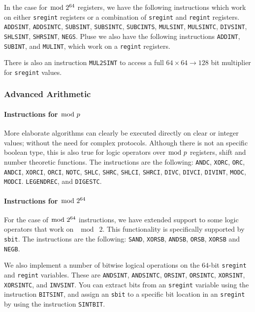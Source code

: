 In  the case for $\bmod \; 2^{64}$ registers, we have the following instructions
which work on either \verb|sregint| registers or a combination
of \verb|sregint| and \verb|regint| registers.
	\verb+ADDSINT+,
	\verb+ADDSINTC+,
	\verb+SUBSINT+,
	\verb+SUBSINTC+,
	\verb+SUBCINTS+,
	\verb+MULSINT+,
	\verb+MULSINTC+,
	\verb+DIVSINT+,
	\verb+SHLSINT+,
	\verb+SHRSINT+,
	\verb+NEGS+.
Pluse we also have the following instructions
  \verb+ADDINT+,
  \verb+SUBINT+, and
  \verb+MULINT+,
which work on a \verb|regint| registers.

There is also an instruction \verb+MUL2SINT+ to access a
full $64 \times 64 \longrightarrow 128$ bit multiplier
for \verb|sregint| values.

\subsubsection{Advanced Arithmetic}
\paragraph{Instructions for $\bmod \; p$}
More elaborate algorithms can clearly be executed directly on
clear or integer values; without the need for complex
protocols. Although there is not an specific boolean type, this is also true for logic operators over $\bmod \; p$ registers, shift and number
theoretic functions. The instructions are the following:
    \verb+ANDC+,
    \verb+XORC+,
    \verb+ORC+,
    \verb+ANDCI+,
    \verb+XORCI+,
    \verb+ORCI+,
    \verb+NOTC+,
    \verb+SHLC+,
    \verb+SHRC+,
    \verb+SHLCI+,
    \verb+SHRCI+,
    \verb+DIVC+,
    \verb+DIVCI+,
    \verb+DIVINT+,
    \verb+MODC+,
    \verb+MODCI+.
    \verb+LEGENDREC+,
and
    \verb+DIGESTC+.
\paragraph{Instructions for $\bmod \; 2^{64}$}
For the case of $\bmod \; 2^{64}$ instructions, we have extended support to some logic operators that work on $\mod \; 2$.
This functionality is specifically supported by \verb+sbit+.
The instructions are the following:
\verb+SAND+,
\verb+XORSB+,
\verb+ANDSB+,
\verb+ORSB+,
\verb+XORSB+ and
\verb+NEGB+.

We also implement a number of bitwise logical operations on the $64$-bit
\verb|sregint| and \verb|regint| variables. These are
\verb+ANDSINT+,
\verb+ANDSINTC+,
\verb+ORSINT+,
\verb+ORSINTC+,
\verb+XORSINT+,
\verb+XORSINTC+,
and
\verb+INVSINT+.
You can extract bits from an \verb|sregint| variable using the instruction
\verb+BITSINT+, and assign an \verb|sbit| to a specific bit location in
an \verb|sregint| by using the instruction \verb+SINTBIT+.

